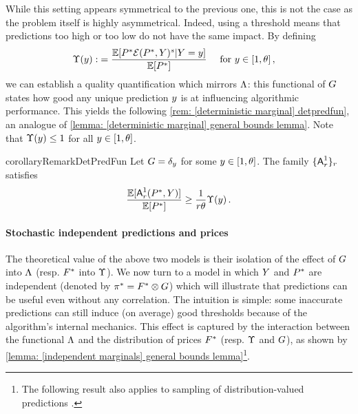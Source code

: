 While this setting appears symmetrical to the previous one, this is not the case as the \OMS{} problem itself is highly asymmetrical. Indeed, using a threshold means that predictions too high or too low do not have the same impact. 
By defining
    \begin{align}
        \Upsilon(y):&=\frac{\mathbb{E}[P^*\mathcal{E}(P^*,Y)^{s}\vert Y=y]}{\mathbb{E}[P^*]}\quad\mbox{  for } y\in[1,\theta] 
        \,,\notag
\end{align}
we can establish a quality quantification which mirrors $\Lambda$: this functional of $G$ states how good any unique prediction $y$ is at influencing algorithmic performance. This yields the following \cref{rem:  [deterministic marginal] detpredfun}, an analogue of \cref{lemma: [deterministic marginal] general bounds lemma}. Note that $\Upsilon(y)\le 1$ for all $y\in[1,\theta]$. 

\begin{restatable}{corollary}{RemarkDetPredFun}\label{rem:  [deterministic marginal] detpredfun}
    Let $G=\delta_{y}$ for some $y\in[1,\theta]$. The family $\{\mbox{\textup{\textsf{A}}}^1_r\}_{r}$ satisfies
\begin{align}
        \frac{\mathbb{E}[\mbox{\textup{\textsf{A}}}^1_r(P^*,Y)]}{\mathbb{E}[P^*]}\ge \frac{1}{r\theta}\Upsilon(y)\,.\label{eq: [deterministic marginal] general bound for det pred}
    \end{align}    %
\end{restatable}


\paragraph{Stochastic independent predictions and prices}
The theoretical value of the above two models is their isolation of the effect of $G$ into $\Lambda$ (resp. $F^*$ into $\Upsilon$). We now turn to a model in which $Y$ and $P^*$ are independent (denoted by $\pi^*=F^*\otimes G$) which will illustrate that predictions can be useful even without any correlation. The intuition is simple: some inaccurate predictions can still induce (on average) good thresholds because of the algorithm's internal mechanics.
This effect is captured by the interaction between the functional $\Lambda$ and the distribution of prices $F^*$ (resp. $\Upsilon$ and $G$), as shown by \cref{lemma: [independent marginals] general bounds lemma}\footnote{The following result also applies to sampling of distribution-valued predictions \citep{angelopoulos_contract_2024,dinitz_binary_2024}.}.


